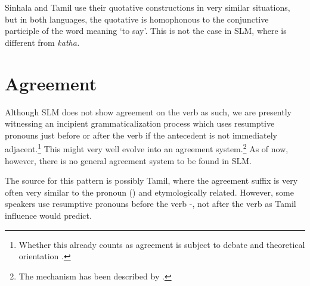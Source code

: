 Sinhala and Tamil use their quotative constructions in very similar situations, but in both languages, the quotative is homophonous to the conjunctive participle of the word meaning `to say'. This is not the case in SLM, where  is different from \em katha\em.









\section{Agreement}\label{sec:cls:Agreement}
Although SLM does not show agreement on the verb as such, we are presently witnessing an incipient grammaticalization process which uses resumptive pronouns just before or after the verb if the antecedent is not immediately adjacent.\footnote{Whether this already counts as agreement is subject to debate and theoretical orientation \citep[cf.][99f.]{Corbett2006}.}
This might very well evolve into an agreement system.\footnote{The mechanism has been described by \citet{Givon1976tpga}.} As of now, however, there is no general agreement system to be found in SLM.




The source for this pattern is possibly Tamil, where the agreement suffix is very often very similar to the pronoun () and etymologically related. However, some speakers use resumptive pronouns before the verb -, not after the verb as Tamil influence would predict.


